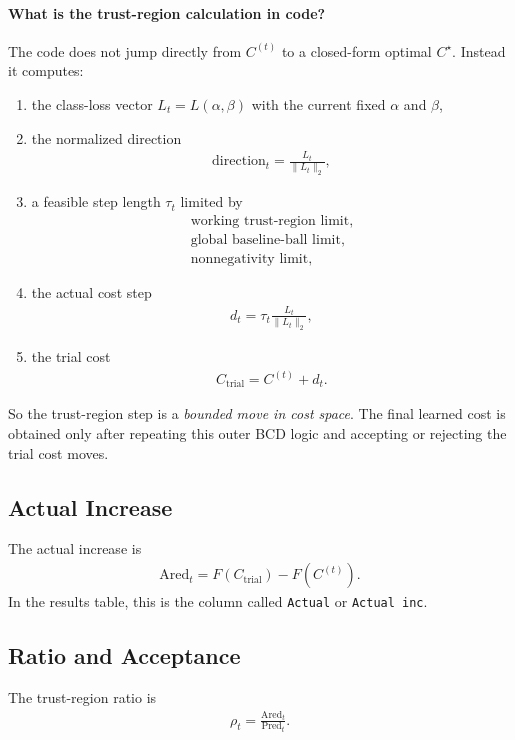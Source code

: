 \documentclass[11pt]{article}
\begin{document}
\paragraph{What is the trust-region calculation in code?}
The code does not jump directly from $C^{(t)}$ to a closed-form optimal
$C^\star$. Instead it computes:
\begin{enumerate}
\item the class-loss vector $L_t = L(\alpha,\beta)$ with the current fixed
$\alpha$ and $\beta$,
\item the normalized direction
\begin{align}
\mathrm{direction}_t = \frac{L_t}{\|L_t\|_2},
\end{align}
\item a feasible step length $\tau_t$ limited by
\begin{align*}
\text{working trust-region limit}, \\
\text{global baseline-ball limit}, \\
\text{nonnegativity limit},
\end{align*}
\item the actual cost step
\begin{align}
d_t = \tau_t \frac{L_t}{\|L_t\|_2},
\end{align}
\item the trial cost
\begin{align}
C_{\mathrm{trial}} = C^{(t)} + d_t.
\end{align}
\end{enumerate}

So the trust-region step is a \emph{bounded move in cost space}. The final
learned cost is obtained only after repeating this outer BCD logic and
accepting or rejecting the trial cost moves.

\subsection{Actual Increase}
The actual increase is
\begin{align}
\mathrm{Ared}_t
=
F(C_{\mathrm{trial}}) - F(C^{(t)}).
\end{align}
In the results table, this is the column called \texttt{Actual} or
\texttt{Actual inc}.

\subsection{Ratio and Acceptance}
The trust-region ratio is
\begin{align}
\rho_t = \frac{\mathrm{Ared}_t}{\mathrm{Pred}_t}.
\end{align}
\end{document}
